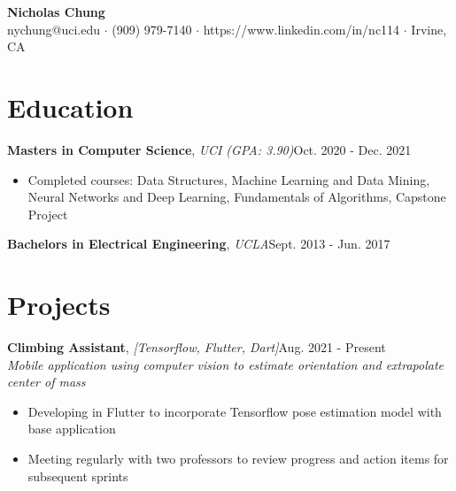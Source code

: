 \documentclass[12pt]{article}
\newcommand\firstboxx[2]{\textbf{\fontsize{12.8}{15}\selectfont #1}, \textit{#2}}
\newcommand{\itemheader}[3]{\firstboxx{#1}{#2}\hfill#3}
\begin{document}
\begin{center}
	\textbf{\LARGE Nicholas Chung} \\ \vspace{.5ex}
	nychung@uci.edu $\cdot$ (909) 979-7140 $\cdot$ https://www.linkedin.com/in/nc114 $\cdot$ Irvine, CA
\end{center}


\section*{Education}
\vspace*{-1em}\makebox[\linewidth]{\rule{\textwidth}{0.4pt}}
\itemheader{Masters in Computer Science}{UCI (GPA: 3.90)}{Oct. 2020 - Dec. 2021}
\begin{itemize}
\item Completed courses: Data Structures, Machine Learning and Data Mining, Neural Networks and Deep Learning, Fundamentals of Algorithms, Capstone Project
\end{itemize}

\smallskip
\itemheader{Bachelors in Electrical Engineering}{UCLA}{Sept. 2013 - Jun. 2017}


\section*{Projects}
\vspace*{-1em}\makebox[\linewidth]{\rule{\textwidth}{0.4pt}}

\itemheader{Climbing Assistant}{[Tensorflow, Flutter, Dart]}{Aug. 2021 - Present}
\\ \textit{Mobile application using computer vision to estimate orientation and extrapolate center of mass}
\begin{itemize}
\item Developing in Flutter to incorporate Tensorflow pose estimation model with base application
\item Meeting regularly with two professors to review progress and action items for subsequent sprints
\end{itemize}
\end{document}
